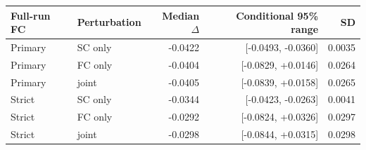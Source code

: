 \begin{tabular}{llrrr}
\toprule
Full-run FC & Perturbation & Median $\Delta$ & Conditional 95\% range & SD \\
\midrule
Primary & SC only & -0.0422 & [-0.0493, -0.0360] & 0.0035 \\
Primary & FC only & -0.0404 & [-0.0829, +0.0146] & 0.0264 \\
Primary & joint & -0.0405 & [-0.0839, +0.0158] & 0.0265 \\
Strict & SC only & -0.0344 & [-0.0423, -0.0263] & 0.0041 \\
Strict & FC only & -0.0292 & [-0.0824, +0.0326] & 0.0297 \\
Strict & joint & -0.0298 & [-0.0844, +0.0315] & 0.0298 \\
\bottomrule
\end{tabular}
